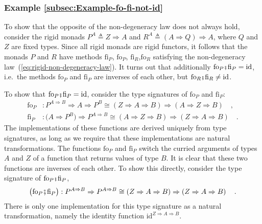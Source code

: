 \subsubsection{Example \label{subsec:Example-fo-fi-not-id}\ref{subsec:Example-fo-fi-not-id}}

To show that the opposite of the non-degeneracy law does not always
hold, consider the rigid monads $P^{A}\triangleq Z\Rightarrow A$
and $R^{A}\triangleq\left(A\Rightarrow Q\right)\Rightarrow A$, where
$Q$ and $Z$ are fixed types. Since all rigid monads are rigid functors,
it follows that the monads $P$ and $R$ have methods $\text{fi}_{P}$,
$\text{fo}_{P}$, $\text{fi}_{R}$,$\text{fo}_{R}$ satisfying the
non-degeneracy law~(\ref{eq:rigid-non-degeneracy-law}). It turns
out that additionally $\text{fo}_{P}\bef\text{fi}_{P}=\text{id}$,
i.e.~the methods $\text{fo}_{P}$ and $\text{fi}_{P}$ are inverses
of each other, but $\text{fo}_{R}\bef\text{fi}_{R}\neq\text{id}$.

To show that $\text{fo}_{P}\bef\text{fi}_{P}=\text{id}$, consider
the type signatures of $\text{fo}_{P}$ and $\text{fi}_{P}$:
\begin{align*}
\text{fo}_{P} & :P^{A\Rightarrow B}\Rightarrow A\Rightarrow P^{B}\cong\left(Z\Rightarrow A\Rightarrow B\right)\Rightarrow\left(A\Rightarrow Z\Rightarrow B\right)\quad,\\
\text{fi}_{P} & :\big(A\Rightarrow P^{B}\big)\Rightarrow P^{A\Rightarrow B}\cong\left(A\Rightarrow Z\Rightarrow B\right)\Rightarrow\left(Z\Rightarrow A\Rightarrow B\right)\quad.
\end{align*}
The implementations of these functions are derived uniquely from type
signatures, as long as we require that these implementations are natural
transformations. The functions $\text{fo}_{P}$ and $\text{fi}_{P}$
switch the curried arguments of types $A$ and $Z$ of a function
that returns values of type $B$. It is clear that these two functions
are inverses of each other. To show this directly, consider the type
signature of $\text{fo}_{P}\bef\text{fi}_{P}$,
\[
\big(\text{fo}_{P}\bef\text{fi}_{P}\big):P^{A\Rightarrow B}\Rightarrow P^{A\Rightarrow B}\cong\left(Z\Rightarrow A\Rightarrow B\right)\Rightarrow\left(Z\Rightarrow A\Rightarrow B\right)\quad.
\]
There is only one implementation for this type signature as a natural
transformation, namely the identity function $\text{id}^{Z\Rightarrow A\Rightarrow B}$.

